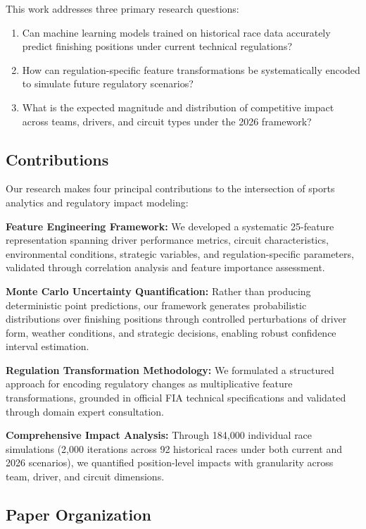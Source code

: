 \documentclass[conference]{IEEEtran}
\begin{document}
This work addresses three primary research questions:

\begin{enumerate}
    \item Can machine learning models trained on historical race data accurately predict finishing positions under current technical regulations?
    \item How can regulation-specific feature transformations be systematically encoded to simulate future regulatory scenarios?
    \item What is the expected magnitude and distribution of competitive impact across teams, drivers, and circuit types under the 2026 framework?
\end{enumerate}

\subsection{Contributions}

Our research makes four principal contributions to the intersection of sports analytics and regulatory impact modeling:

\textbf{Feature Engineering Framework:} We developed a systematic 25-feature representation spanning driver performance metrics, circuit characteristics, environmental conditions, strategic variables, and regulation-specific parameters, validated through correlation analysis and feature importance assessment.

\textbf{Monte Carlo Uncertainty Quantification:} Rather than producing deterministic point predictions, our framework generates probabilistic distributions over finishing positions through controlled perturbations of driver form, weather conditions, and strategic decisions, enabling robust confidence interval estimation.

\textbf{Regulation Transformation Methodology:} We formulated a structured approach for encoding regulatory changes as multiplicative feature transformations, grounded in official FIA technical specifications and validated through domain expert consultation.

\textbf{Comprehensive Impact Analysis:} Through 184,000 individual race simulations (2,000 iterations across 92 historical races under both current and 2026 scenarios), we quantified position-level impacts with granularity across team, driver, and circuit dimensions.

\subsection{Paper Organization}
\end{document}
